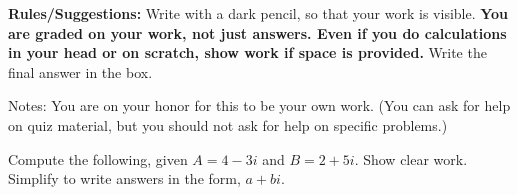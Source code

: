 \documentclass[11pt,addpoints,answers]{exam}
\begin{document}


{\small \noindent \textbf{Rules/Suggestions:} Write with a dark pencil, so that your work is visible.  \textbf{You are graded on your work, not just answers. Even if you do calculations in your head or on scratch, show work if space is provided. } Write the final answer in the box.

Notes: You are on your honor for this to be your own work.  (You can ask for help on quiz material, but you should not ask for help on specific problems.) }
\begin{questions}

\question Compute the following, given $A=4-3i$ and $B=2+5i$. Show clear work. Simplify to write answers in the form, $a+bi$.
\begin{parts}\end{parts}

\vspace{1in}
\begin{multicols}{3}
\begin{flushleft}
\end{flushleft}

\columnbreak

\begin{flushleft}
\end{flushleft}


\end{multicols}
\end{questions}
\end{document}
